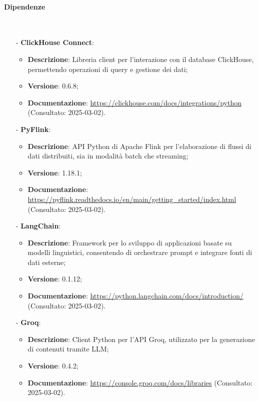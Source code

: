 \documentclass[10pt]{article}
\newcommand{\myparagraph}[1]{\paragraph{#1}\mbox{}\\}
\begin{document}
\myparagraph{Dipendenze}
\begin{itemize}
    \item[-] \textbf{ClickHouse Connect}:
    \begin{itemize}
        \item \textbf{Descrizione}: Libreria client per l'interazione con il database ClickHouse, permettendo operazioni di query e gestione dei dati;
        \item \textbf{Versione}: 0.6.8;
        \item \textbf{Documentazione}: \textcolor{blue}{\url{https://clickhouse.com/docs/integrations/python}} (Consultato: 2025-03-02).
    \end{itemize}

    \item[-] \textbf{PyFlink}:
    \begin{itemize}
        \item \textbf{Descrizione}: API Python di Apache Flink per l'elaborazione di flussi di dati distribuiti, sia in modalità batch che streaming;
        \item \textbf{Versione}: 1.18.1;
        \item \textbf{Documentazione}: \textcolor{blue}{\url{https://pyflink.readthedocs.io/en/main/getting_started/index.html}} (Consultato: 2025-03-02).
    \end{itemize}

    \item[-] \textbf{LangChain}:
    \begin{itemize}
        \item \textbf{Descrizione}: Framework per lo sviluppo di applicazioni basate su modelli linguistici, consentendo di orchestrare prompt e integrare fonti di dati esterne;
        \item \textbf{Versione}: 0.1.12;
        \item \textbf{Documentazione}: \textcolor{blue}{\url{https://python.langchain.com/docs/introduction/}} (Consultato: 2025-03-02).
    \end{itemize}

    \item[-] \textbf{Groq}:
    \begin{itemize}
        \item \textbf{Descrizione}: Client Python per l'API Groq, utilizzato per la generazione di contenuti tramite LLM;
        \item \textbf{Versione}: 0.4.2;
        \item \textbf{Documentazione}: \textcolor{blue}{\url{https://console.groq.com/docs/libraries}} (Consultato: 2025-03-02).
    \end{itemize}


\end{itemize}
\end{document}
